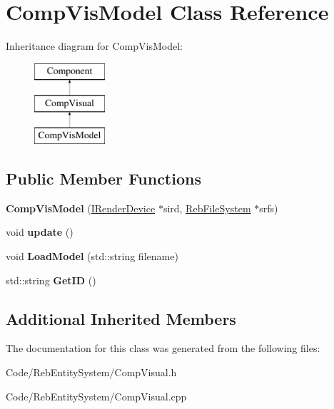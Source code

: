 \hypertarget{class_comp_vis_model}{}\section{Comp\+Vis\+Model Class Reference}
\label{class_comp_vis_model}
Inheritance diagram for Comp\+Vis\+Model\+:\begin{figure}[H]
\begin{center}
\leavevmode
\includegraphics[height=3.000000cm]{class_comp_vis_model}
\end{center}
\end{figure}
\subsection*{Public Member Functions}
\begin{DoxyCompactItemize}
\item 
{\bfseries Comp\+Vis\+Model} (\hyperlink{class_i_render_device}{I\+Render\+Device} $\ast$sird, \hyperlink{class_reb_file_system}{Reb\+File\+System} $\ast$srfs)\hypertarget{class_comp_vis_model_a339383004ab2d165964a4e7c7927e8b4}{}\label{class_comp_vis_model_a339383004ab2d165964a4e7c7927e8b4}

\item 
void {\bfseries update} ()\hypertarget{class_comp_vis_model_a550eee5395e9c3caa59e4b6f22f781a0}{}\label{class_comp_vis_model_a550eee5395e9c3caa59e4b6f22f781a0}

\item 
void {\bfseries Load\+Model} (std\+::string filename)\hypertarget{class_comp_vis_model_a2f534d09a99504b65fd4da7219bccc34}{}\label{class_comp_vis_model_a2f534d09a99504b65fd4da7219bccc34}

\item 
std\+::string {\bfseries Get\+ID} ()\hypertarget{class_comp_vis_model_a9259963810adc0cb523f47e2ff36b7cd}{}\label{class_comp_vis_model_a9259963810adc0cb523f47e2ff36b7cd}

\end{DoxyCompactItemize}
\subsection*{Additional Inherited Members}


The documentation for this class was generated from the following files\+:\begin{DoxyCompactItemize}
\item 
Code/\+Reb\+Entity\+System/Comp\+Visual.\+h\item 
Code/\+Reb\+Entity\+System/Comp\+Visual.\+cpp\end{DoxyCompactItemize}
